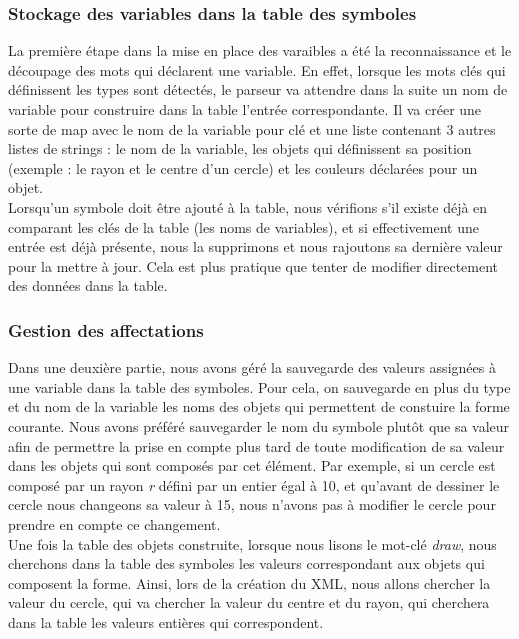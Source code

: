 			\subsubsection{Stockage des variables dans la table des symboles}
				La première étape dans la mise en place des varaibles a été la reconnaissance et le découpage des mots qui déclarent une variable. En effet, lorsque les mots clés qui définissent les types sont détectés, le parseur va attendre dans la suite un nom de variable pour construire dans la table l'entrée correspondante. Il va créer une sorte de map avec le nom de la variable pour clé et une liste contenant 3 autres listes de strings : le nom de la variable, les objets qui définissent sa position (exemple : le rayon et le centre d'un cercle) et les couleurs déclarées pour un objet. \\
				
				Lorsqu'un symbole doit être ajouté à la table, nous vérifions s'il existe déjà en comparant les clés de la table (les noms de variables), et si effectivement une entrée est déjà présente, nous la supprimons et nous rajoutons sa dernière valeur pour la mettre à jour. Cela est plus pratique que tenter de modifier directement des données dans la table.
			
			\subsubsection{Gestion des affectations}
			Dans une deuxière partie, nous avons géré la sauvegarde des valeurs assignées à une variable dans la table des symboles. Pour cela, on sauvegarde en plus du type et du nom de la variable les noms des objets qui permettent de constuire la forme courante. Nous avons préféré sauvegarder le nom du symbole plutôt que sa valeur afin de permettre la prise en compte plus tard de toute modification de sa valeur dans les objets qui sont composés par cet élément. Par exemple, si un cercle est composé par un rayon \emph{r} défini par un entier égal à 10, et qu'avant de dessiner le cercle nous changeons sa valeur à 15, nous n'avons pas à modifier le cercle pour prendre en compte ce changement. \\
			
			Une fois la table des objets construite, lorsque nous lisons le mot-clé \emph{draw}, nous cherchons dans la table des symboles les valeurs correspondant aux objets qui composent la forme. Ainsi, lors de la création du XML, nous allons chercher la valeur du cercle, qui va chercher la valeur du centre et du rayon, qui cherchera dans la table les valeurs entières qui correspondent.
			

